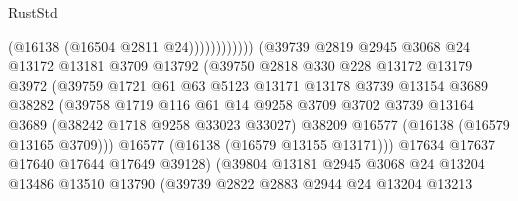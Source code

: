 \begin{lexlean}{RustStd}
\begin{coremodule}
                                              (@16138 (@16504 @2811 @24))))))))))))
                          (@39739
                            @2819
                            @2945
                            @3068
                            @24
                            @13172
                            @13181
                            @3709
                            @13792
                            (@39750
                              @2818
                              @330
                              @228
                              @13172
                              @13179
                              @3972
                              (@39759
                                @1721
                                @61
                                @63
                                @5123
                                @13171
                                @13178
                                @3739
                                @13154
                                @3689
                                @38282
                                (@39758
                                  @1719
                                  @116
                                  @61
                                  @14
                                  @9258
                                  @3709
                                  @3702
                                  @3739
                                  @13164
                                  @3689
                                  (@38242 @1718 @9258 @33023 @33027)
                                  @38209
                                  @16577
                                  (@16138 (@16579 @13165 @3709)))
                                @16577
                                (@16138 (@16579 @13155 @13171)))
                              @17634
                              @17637
                              @17640
                              @17644
                              @17649
                              @39128)
                            (@39804
                              @13181
                              @2945
                              @3068
                              @24
                              @13204
                              @13486
                              @13510
                              @13790
                              (@39739
                                @2822
                                @2883
                                @2944
                                @24
                                @13204
                                @13213

\end{coremodule}
\end{lexlean}
